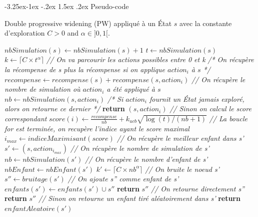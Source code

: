 \documentclass[pdftex,french, english]{article}	%
\makeatletter
\newcounter {subsubsubsection}[subsubsection]
\newcommand\subsubsubsection{\@startsection{subsubsubsection}{4}{\z@}%
                                     {-3.25ex\@plus -1ex \@minus -.2ex}%
                                     {1.5ex \@plus .2ex}%
                                     {\normalfont\normalsize\bfseries}}
\makeatother
\begin{document}
		\subsubsubsection{Pseudo-code} \label{dpw:code}

			\begin{algorithm}
				\caption{Double progressive widening (PW) appliqué à un État $s$ avec la constante d'exploration $C > 0$ and $\alpha \in ]0, 1[$.}
				\label{alg:dpw}
					\begin{algorithmic}[1]
							\State $nbSimulation(s) \gets nbSimulation(s) + 1$ 
							\State $t \gets nbSimulation(s)$
							\State $k \gets \lceil{C \times t^{\alpha}}\rceil$
							\State \textit{// On va parcourir les actions possibles entre 0 et k}
								\State \textit{/* On récupère la récompense de s plus la récompense si on applique $action_{i}$ à $s$ */}
								\State $recompense \gets recompense(s) + recompense(s, action_{i})$
								\State \textit{// On récupère le nombre de simulation où $action_{i}$ a été appliqué à $s$}
								\State $nb \gets nbSimulation(s, action_{i})$
									\State \textit{/* Si $action_{i}$ fournit un État jamais exploré, alors on retourne ce dernier */}
									\State \textbf{return} $(s, action_{i})$
								\Else
									\State \textit{// Sinon on calcul le score correspondant}
									\State $score(i) \gets \frac{recompense}{nb} + \textbf{$k_{ucb}$}\sqrt{\log(t)/(nb + 1)}$							
								\EndIf
							\EndFor
							\State \textit{// La boucle for est terminée, on recupère l'indice ayant le score maximal}
							\State $i_{max} \gets indiceMaximisant(score)$
							\State \textit{// On récupère le meilleur enfant dans s'}
							\State $s' \gets (s, action_{i_{max}})$
							\State \textit{// On récupère le nombre de simulation de s'}
							\State $nb \gets nbSimulation(s')$
							\State \textit{// On récupère le nombre d'enfant de s'}
							\State $nbEnfant \gets nbEnfant(s')$
							\State $k' \gets \lceil{C \times nb^{\alpha}}\rceil$
								\State \textit{// On bruite le noeud s'}
								\State $s'' \gets bruitage(s')$
									\State \textit{// On ajoute s'' comme enfant de s'}
									\State $enfants(s') \gets enfants(s') \cup s''$
									\State \textbf{return} $s''$
								\Else
									\State \textit{// On retourne directement s''}
									\State \textbf{return} $s''$
								\EndIf
							\Else
								\State \textit{// Sinon on retourne un enfant tiré aléatoirement dans s'}
								\State \textbf{return} $enfantAleatoire(s')$
							\EndIf
						\EndFunction
					\end{algorithmic}
			\end{algorithm}
\end{document}
